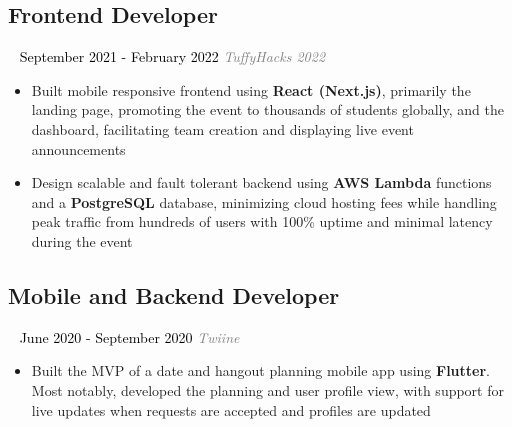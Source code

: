 \documentclass{article}
\newcommand{\resumesection}[3]{
    \subsection*{#1}
    \ 
    \normalsize
    \normalsize
    \hfill
    \textcolor{black}{#3}
    \normalsize
    \newline
    \small
    \textcolor{grey}{\emph{#2}}
}
\begin{document}
\resumesection{Frontend Developer}{TuffyHacks 2022}{September 2021 - February 2022}
\begin{itemize}
	\item Built mobile responsive frontend using \textbf{React (Next.js)}, primarily the landing page, promoting the event to thousands of students globally, and the dashboard, facilitating team creation and displaying live event announcements
	\item Design scalable and fault tolerant backend using \textbf{AWS Lambda} functions and a \textbf{PostgreSQL} database, minimizing cloud hosting fees while handling peak traffic from hundreds of users with 100\% uptime and minimal latency during the event
\end{itemize}
\resumesection{Mobile and Backend Developer}{Twiine}{June 2020 - September 2020}
\begin{itemize}
	\item Built the MVP of a date and hangout planning mobile app using \textbf{Flutter}. Most notably, developed the planning and user profile view, with support for live updates when requests are accepted and profiles are updated
\end{itemize}
\end{document}
